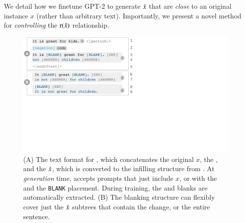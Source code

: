 We detail how we finetune GPT-2 to generate $\hat{x}$ that are \emph{close} to an original instance $x$ (rather than arbitrary text).
Importantly, we present a novel method for \emph{controlling} the $\operatorname*{r}(\hat{x})$ relationship. 

\begin{figure}[t]
\centering
\includegraphics[trim={0 18.8cm 31cm 0cm}, clip, width=1\columnwidth]{figures/blank.pdf}
\vspace{-15pt}
\caption{  
(A) The text format for \sysname, which concatenates the original $x$, the \tagstr, and the $\hat{x}$, which is converted to the infilling structure from .
At \emph{generation} time, \sysname accepts prompts that just include $x$, or with the \tagstrshort and the \texttt{BLANK} placement.
During training, the \tagstrshorts and blanks are automatically extracted.
(B) The blanking structure can flexibly cover just the $\hat{x}$ subtrees that contain the change, or the entire sentence.
}
\vspace{-10pt}
\label{fig:blank}
\end{figure}


